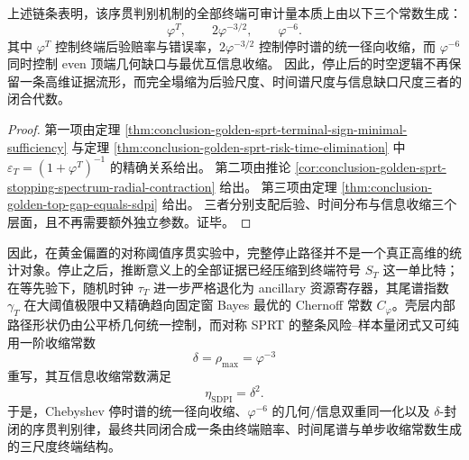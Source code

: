 \begin{corollary}[停止实验的三常数闭包]\label{cor:conclusion-golden-sprt-three-constant-closure}
上述链条表明，该序贯判别机制的全部终端可审计量本质上由以下三个常数生成：
\[
\varphi^T,
\qquad
2\varphi^{-3/2},
\qquad
\varphi^{-6}.
\]
其中 \(\varphi^T\) 控制终端后验赔率与错误率，\(2\varphi^{-3/2}\) 控制停时谱的统一径向收缩，而 \(\varphi^{-6}\) 同时控制 even 顶端几何缺口与最优互信息收缩。
因此，停止后的时空逻辑不再保留一条高维证据流形，而完全塌缩为后验尺度、时间谱尺度与信息缺口尺度三者的闭合代数。
\end{corollary}
\begin{proof}
第一项由定理 \ref{thm:conclusion-golden-sprt-terminal-sign-minimal-sufficiency} 与定理 \ref{thm:conclusion-golden-sprt-risk-time-elimination} 中
\(
\varepsilon_T=(1+\varphi^T)^{-1}
\)
的精确关系给出。
第二项由推论 \ref{cor:conclusion-golden-sprt-stopping-spectrum-radial-contraction} 给出。
第三项由定理 \ref{thm:conclusion-golden-top-gap-equals-sdpi} 给出。
三者分别支配后验、时间分布与信息收缩三个层面，且不再需要额外独立参数。证毕。
\end{proof}

\noindent
因此，在黄金偏置的对称阈值序贯实验中，完整停止路径并不是一个真正高维的统计对象。停止之后，推断意义上的全部证据已经压缩到终端符号 \(S_T\) 这一单比特；在等先验下，随机时钟 \(\tau_T\) 进一步严格退化为 ancillary 资源寄存器，其尾谱指数 \(\gamma_T\) 在大阈值极限中又精确趋向固定窗 Bayes 最优的 Chernoff 常数 \(C_\varphi\)。壳层内部路径形状仍由公平桥几何统一控制，而对称 SPRT 的整条风险--样本量闭式又可纯用一阶收缩常数
\[
\delta=\rho_{\max}=\varphi^{-3}
\]
重写，其互信息收缩常数满足
\[
\eta_{\mathrm{SDPI}}=\delta^2.
\]
于是，Chebyshev 停时谱的统一径向收缩、\(\varphi^{-6}\) 的几何/信息双重同一化以及 \(\delta\)-封闭的序贯判别律，最终共同闭合成一条由终端赔率、时间尾谱与单步收缩常数生成的三尺度终端结构。

\endinput
